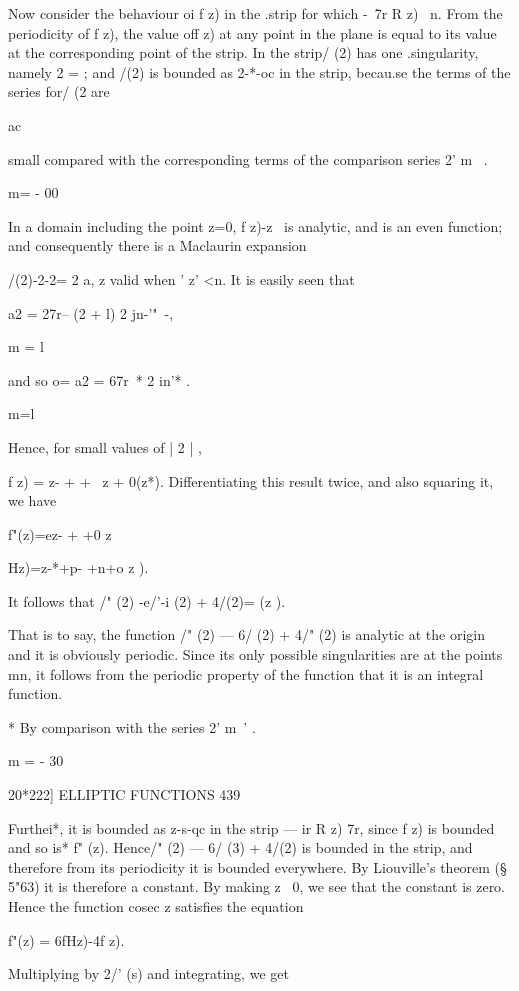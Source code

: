 {Now consider the behaviour oi f z) in the .strip for which -\ 7r R z)
\ n. From the periodicity of f z), the value off z) at any point in
the plane is equal to its value at the corresponding point of the
strip. In the strip/ (2) has one .singularity, namely 2 = ; and /(2)
is bounded as 2-*-oc in the strip, becau.se the terms of the series
for/ (2 are

ac

small compared with the corresponding terms of the comparison series
2' m~ .

m= - 00

In a domain including the point z=0, f z)-z~ is analytic, and is an
even function; and consequently there is a Maclaurin expansion

/(2)-2-2= 2 a, z valid when ' z' <n. It is easily seen that

a2 = 27r-- (2 + l) 2 jn-'"~-,

m = l

and so o= a2 = 67r~* 2 in'* .

m=l

Hence, for small values of | 2 | ,

f z) = z- + + \ z + 0(z*). Differentiating this result twice, and also
squaring it, we have

f"(z)=ez- + +0 z%

 Hz)=z-*+p- +n+o z ).

It follows that /" (2) -e/'-i (2) + 4/(2)= (z ).

That is to say, the function /" (2) — 6/ (2) + 4/" (2) is analytic at
the origin and it is obviously periodic. Since its only possible
singularities are at the points mn, it follows from the periodic
property of the function that it is an integral function.

* By comparison with the series 2' m~' .

m = - 30



20*222] ELLIPTIC FUNCTIONS 439

Furthei*, it is bounded as z-s-qc in the strip — ir R z) 7r, since f
z) is bounded and so is* f" (z). Hence/" (2) — 6/ (3) + 4/(2) is
bounded in the strip, and therefore from its periodicity it is bounded
everywhere. By Liouville's theorem (§ 5"63) it is therefore a
constant. By making z ~0, we see that the constant is zero. Hence the
function cosec z satisfies the equation

f"(z) = 6fHz)-4f z).

Multiplying by 2/' (s) and integrating, we get

}
